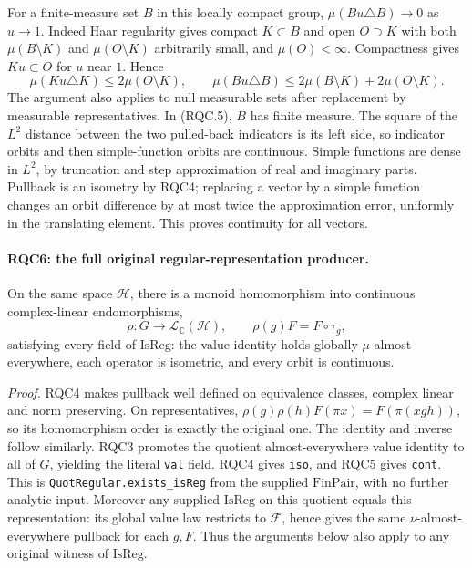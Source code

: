 \documentclass[11pt,a4paper]{article}
\numberwithin{equation}{section}
\theoremstyle{remark}\newtheorem{remark}[theorem]{Remark}
\begin{document}
For a finite-measure set \(B\) in this locally compact group,
\(\mu(Bu\triangle B)\to0\) as \(u\to1\).
Indeed Haar regularity gives compact \(K\subset B\) and open
\(O\supset K\) with both \(\mu(B\setminus K)\) and
\(\mu(O\setminus K)\) arbitrarily small, and \(\mu(O)<\infty\).
Compactness gives \(Ku\subset O\) for \(u\) near \(1\).  Hence
\[
 \mu(Ku\triangle K)\le2\mu(O\setminus K),\qquad
 \mu(Bu\triangle B)\le
 2\mu(B\setminus K)+2\mu(O\setminus K).
 \tag{RQC.7}
\]
The argument also applies to null measurable sets after replacement
by measurable representatives.  In (RQC.5), \(B\) has finite
measure.  The square of the \(L^2\) distance between the two
pulled-back indicators is its left side, so indicator orbits and
then simple-function orbits are continuous.  Simple functions are
dense in \(L^2\), by truncation and step approximation of real and
imaginary parts.  Pullback is an isometry by RQC4; replacing a
vector by a simple function changes an orbit difference by at
most twice the approximation error, uniformly in the translating
element.  This proves continuity for all vectors.

\paragraph{RQC6: the full original regular-representation producer.}
\label{claim:RQC6}
On the same space \(\mathcal H\), there is a monoid homomorphism
into continuous complex-linear endomorphisms,
\[
 \rho:G\longrightarrow\mathcal L_{\mathbb C}(\mathcal H),
 \qquad \rho(g)F=F\circ\tau_g,
 \tag{RQC.8}
\]
satisfying every field of \(\mathrm{IsReg}\): the value identity
holds globally \(\mu\)-almost everywhere, each operator is
isometric, and every orbit is continuous.

\emph{Proof.}
RQC4 makes pullback well defined on equivalence classes, complex
linear and norm preserving.  On representatives,
\(\rho(g)\rho(h)F(\pi x)=F(\pi(xgh))\), so its homomorphism
order is exactly the original one.  The identity and inverse
follow similarly.  RQC3 promotes the quotient almost-everywhere
value identity to all of \(G\), yielding the literal
\texttt{val} field.  RQC4 gives \texttt{iso}, and RQC5 gives
\texttt{cont}.  This is \texttt{QuotRegular.exists\_isReg} from the
supplied \(\mathrm{FinPair}\), with no further analytic input.
Moreover any supplied \(\mathrm{IsReg}\) on this quotient equals
this representation: its global value law restricts to
\(\mathcal F\), hence gives the same \(\nu\)-almost-everywhere
pullback for each \(g,F\).  Thus the arguments below also apply
to any original witness of \(\mathrm{IsReg}\).
\end{document}
